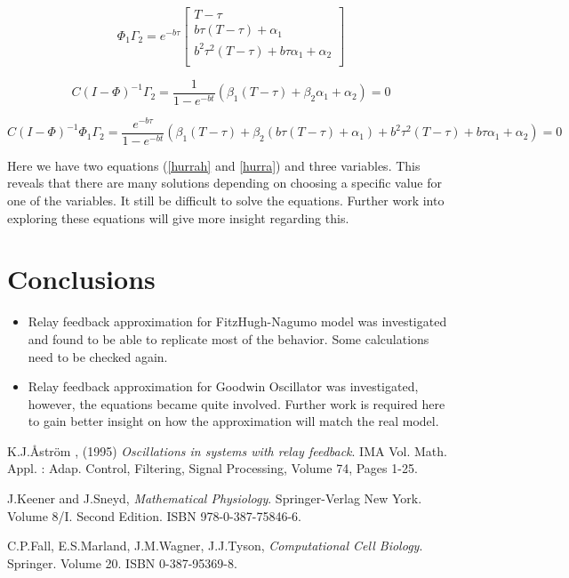 \documentclass[a4paper]{article}
\begin{document}
\begin{equation}
\Phi_1\Gamma_2 =  e^{-b\tau}\begin{bmatrix}
T-\tau\\ b\tau(T-\tau) + \alpha_1 \\
b^2\tau^2(T-\tau) + b\tau\alpha_1 + \alpha_2\\
\end{bmatrix}
\end{equation}


\begin{equation}\label{hurrah}
C(I-\Phi)^{-1}\Gamma_2 = \frac{1}{1-e^{-bt}}\left(\beta_1 (T-\tau) + \beta_2\alpha_1 + \alpha_2\right) = 0
\end{equation}

\begin{equation} \label{hurra}
C(I-\Phi)^{-1}\Phi_1\Gamma_2 = \frac{e^{-b\tau}}{1-e^{-bt}}\left(\beta_1(T-\tau) + \beta_2(b\tau(T-\tau) + \alpha_1) + b^2\tau^2(T-\tau) + b\tau\alpha_1 + \alpha_2\right) = 0
\end{equation}


Here we have two equations (\ref{hurrah} and \ref{hurra}) and three variables. This reveals that there are many solutions depending on choosing a specific value for one of the variables. It still be difficult to solve the equations. Further work into exploring these equations will give more insight regarding this.

\section{Conclusions}
\begin{itemize}
\item Relay feedback approximation for FitzHugh-Nagumo model was investigated and found to be able to replicate most of the behavior. Some calculations need to be checked again. 
\item Relay feedback approximation for Goodwin Oscillator was investigated, however, the equations became quite involved. Further work is required here to gain better insight on how the approximation will match the real model. 
\end{itemize}


\begin{thebibliography}{9}

K.J.\r{A}str\"{o}m , (1995) \emph{Oscillations in systems with relay feedback}. IMA Vol. Math. Appl. : Adap. Control, Filtering, Signal Processing, Volume 74, Pages 1-25. 

J.Keener and J.Sneyd, \emph{Mathematical Physiology}. Springer-Verlag New York. Volume 8/I. Second Edition. ISBN 978-0-387-75846-6. 

C.P.Fall, E.S.Marland, J.M.Wagner, J.J.Tyson, \emph{Computational Cell Biology}. Springer. Volume 20. ISBN 0-387-95369-8. 

\end{thebibliography}
\end{document}
